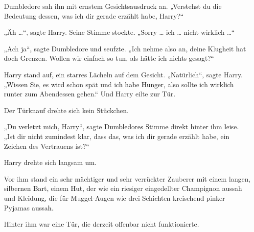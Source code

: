 Dumbledore sah ihn mit ernstem Gesichtsausdruck an.
„Verstehst du die Bedeutung dessen, was ich dir gerade erzählt habe, Harry?“

„Äh …“, sagte Harry. Seine Stimme stockte.
„Sorry … ich … nicht wirklich …“

„Ach ja“, sagte Dumbledore und seufzte.
„Ich nehme also an, deine Klugheit hat doch Grenzen. Wollen wir einfach so tun, als hätte ich nichts gesagt?“

Harry stand auf, ein starres Lächeln auf dem Gesicht.
„Natürlich“, sagte Harry.
„Wissen Sie, es wird schon spät und ich habe Hunger, also sollte ich wirklich runter zum Abendessen gehen.“ Und Harry eilte zur Tür.

Der Türknauf drehte sich kein Stückchen.

„Du verletzt mich, Harry“, sagte Dumbledores Stimme direkt hinter ihm leise.
„Ist dir nicht zumindest klar, dass das, was ich dir gerade erzählt habe, ein Zeichen des Vertrauens ist?“

Harry drehte sich langsam um.

Vor ihm stand ein sehr mächtiger und sehr verrückter Zauberer mit einem langen, silbernen Bart, einem Hut, der wie ein riesiger eingedellter Champignon aussah und Kleidung, die für Muggel-Augen wie drei Schichten kreischend pinker Pyjamas aussah.

Hinter ihm war eine Tür, die derzeit offenbar nicht funktionierte.

